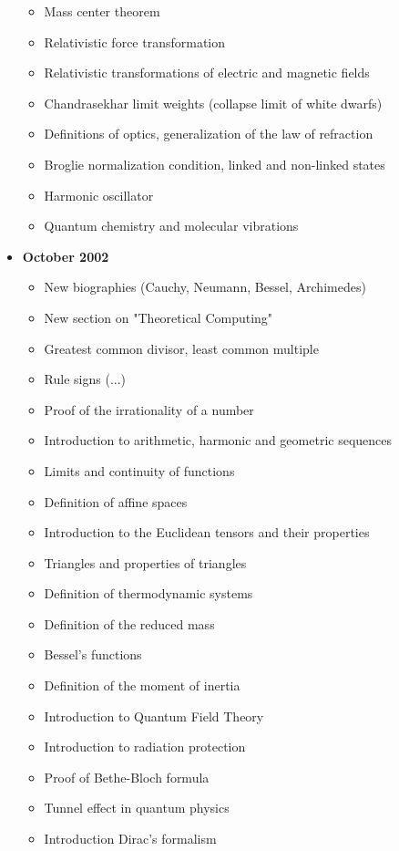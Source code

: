 \documentclass[12pt,a4paper,twoside,openright]{report}
\theoremstyle{definition}
\theoremstyle{itexmp}
\numberwithin{equation}{section}
\begin{document}
\begin{itemize}
\begin{itemize}[noitemsep]
				\item Mass center theorem
				\item Relativistic force transformation
				\item Relativistic transformations of electric and magnetic fields
				\item Chandrasekhar limit weights (collapse limit of white dwarfs)
				\item Definitions of optics, generalization of the law of refraction
				\item Broglie normalization condition, linked and non-linked states
				\item Harmonic oscillator
				\item Quantum chemistry and molecular vibrations
			\end{itemize}
		\item \textbf{October 2002}
			\begin{itemize}[noitemsep]
				\item New biographies (Cauchy, Neumann, Bessel, Archimedes)
				\item New section on "Theoretical Computing"
				\item Greatest common divisor, least common multiple
				\item Rule signs (...)
				\item Proof of the irrationality of a number
				\item Introduction to arithmetic, harmonic and geometric sequences
				\item Limits and continuity of functions
				\item Definition of affine spaces
				\item Introduction to the Euclidean tensors and their properties
				\item Triangles and properties of triangles
				\item Definition of thermodynamic systems
				\item Definition of the reduced mass
				\item Bessel's functions
				\item Definition of the moment of inertia
				\item Introduction to Quantum Field Theory
				\item Introduction to radiation protection
				\item Proof of Bethe-Bloch formula
				\item Tunnel effect in quantum physics
				\item Introduction Dirac's formalism

\end{itemize}
\end{itemize}
\end{document}
